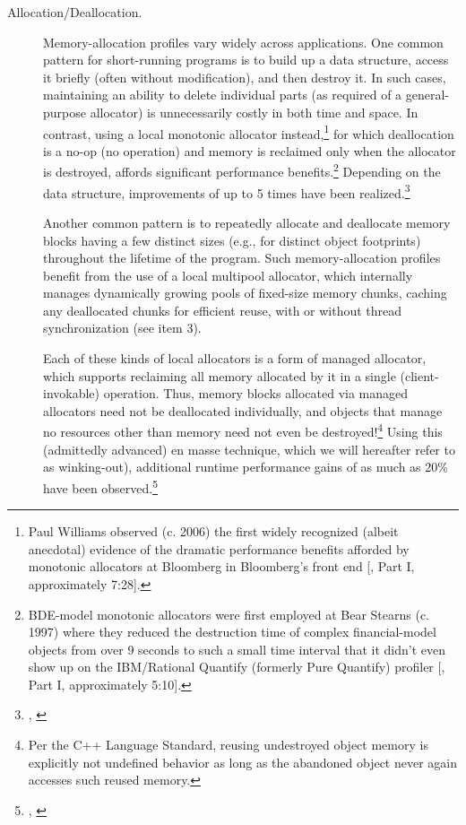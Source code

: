 \begin{description}
  \item[Allocation/Deallocation.] Memory-allocation profiles vary widely across
applications. One common pattern for short-running programs is to build up
a data structure, access it briefly (often without modification), and then
destroy it. In such cases, maintaining an ability to delete individual parts (as
required of a general-purpose allocator) is unnecessarily costly in both time
and space. In contrast, using a local monotonic allocator instead,\footnote{Paul Williams observed (c. 2006) the first widely recognized (albeit anecdotal) evidence of the
dramatic performance benefits afforded by monotonic allocators at Bloomberg in Bloomberg’s front
end [\cite{lakos17b}, Part I, approximately 7:28].} for which
deallocation is a no-op (no operation) and memory is reclaimed only when the
allocator is destroyed, affords significant performance benefits.\footnote{BDE-model monotonic allocators were first employed at Bear Stearns (c. 1997) where they reduced
the destruction time of complex financial-model objects from over 9 seconds to such a small time
interval that it didn’t even show up on the IBM/Rational Quantify (formerly Pure Quantify) profiler
[\cite{lakos17b}, Part I, approximately 5:10].}
Depending
on the data structure, improvements of up to 5 times have been realized.\footnote{\cite{bleaney16}, \cite{lakos16}}

Another common pattern is to repeatedly allocate and deallocate memory
blocks having a few distinct sizes (e.g., for distinct object footprints)
throughout the lifetime of the program. Such memory-allocation profiles
benefit from the use of a local multipool allocator, which internally manages
dynamically growing pools of fixed-size memory chunks, caching any
deallocated chunks for efficient reuse, with or without thread synchronization
(see item 3).

Each of these kinds of local allocators is a form of managed allocator, which
supports reclaiming all memory allocated by it in a single (client-invokable)
operation. Thus, memory blocks allocated via managed allocators need not be
deallocated individually, and objects that manage no resources other than
memory need not even be destroyed!\footnote{Per the C++ Language Standard, reusing undestroyed object memory is explicitly not undefined
behavior as long as the abandoned object never again accesses such reused memory.}  Using this (admittedly advanced) en
masse technique, which we will hereafter refer to as winking-out), additional
runtime performance gains of as much as 20\% have been observed.\footnote{\cite{bleaney16}, \cite{lakos16}}


\end{description}
